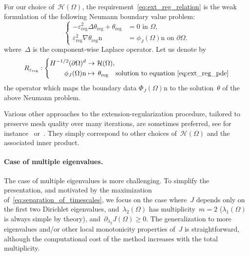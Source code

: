 \documentclass[a4]{article}
\newcommand{\n}{\mathrm{n}}
\newcommand{\reg}{\mathrm{reg}}
\newcommand{\1}{\mathbbm 1}
\begin{document}
For our choice of~$\mathcal H(\Omega)$, the requirement~\eqref{eq:ext_reg_relation} is the weak formulation of the following Neumann boundary value problem:
\begin{equation}
    \label{eq:ext_reg_pde}
    \left\{
        \begin{aligned}
            -\varepsilon_\reg^2\Delta \theta_\reg + \theta_\reg &= 0\text{ in }\Omega,\\
            \varepsilon_\reg^2\nabla\theta_\reg\n &= \phi_J(\Omega)\n\text{ on }\partial\Omega.
        \end{aligned}
    \right.
\end{equation}
where~$\Delta$ is the component-wise Laplace operator. Let us denote by
\begin{equation}
    \label{eq:ext_reg_op}
    R_{\varepsilon_\reg}:\left\{
    \begin{aligned}
        H^{-1/2}(\partial\Omega)^d &\to \mathcal H(\Omega),\\
        \phi_J(\Omega)\n &\mapsto\,\theta_\reg \quad \text{solution to equation~\eqref{eq:ext_reg_pde}}
    \end{aligned}
    \right.
\end{equation}
the operator which maps the boundary data $\Phi_J(\Omega)\n$ to the solution~$\theta$ of the above Neumann problem.

Various other approaches to the extension-regularization procedure, tailored to preserve mesh quality over many iterations, are sometimes preferred, see for instance~\cite[Section 3.5]{DFOP18} or~\cite[Section 5.2.2]{ADJ21}. They simply correspond to other choices of~$\mathcal H(\Omega)$ and the associated inner product.

\paragraph{Case of multiple eigenvalues.}
The case of multiple eigenvalues is more challenging. To simplify the presentation, and motivated by the maximization of~\eqref{eq:separation_of_timescales}, we focus on the case where~$J$ depends only on the first two Dirichlet eigenvalues, and~$\lambda_2(\Omega)$ has multiplicity~$m = 2$ ($\lambda_1(\Omega)$ is always simple by theory), and~$\partial_{\lambda_2} J(\Omega)\geq 0$. The generalization to more eigenvalues and/or other local monotonicity properties of~$J$ is straightforward, although the computational cost of the method increases with the total multiplicity.
\end{document}
